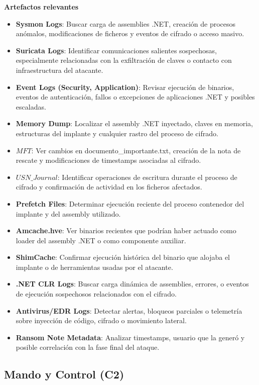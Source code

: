\textbf{Artefactos relevantes}
\begin{itemize}
    \item \textbf{Sysmon Logs}: Buscar carga de assemblies .NET, creación de procesos anómalos, modificaciones de ficheros y eventos de cifrado o acceso masivo.
    \item \textbf{Suricata Logs}: Identificar comunicaciones salientes sospechosas, especialmente relacionadas con la exfiltración de claves o contacto con infraestructura del atacante.
    \item \textbf{Event Logs (Security, Application)}: Revisar ejecución de binarios, eventos de autenticación, fallos o excepciones de aplicaciones .NET y posibles escaladas.
    \item \textbf{Memory Dump}: Localizar el assembly .NET inyectado, claves en memoria, estructuras del implante y cualquier rastro del proceso de cifrado.
    \item \textbf{$MFT$}: Ver cambios en documento\_importante.txt, creación de la nota de rescate y modificaciones de timestamps asociadas al cifrado.
    \item \textbf{$USN\_Journal$}: Identificar operaciones de escritura durante el proceso de cifrado y confirmación de actividad en los ficheros afectados.
    \item \textbf{Prefetch Files}: Determinar ejecución reciente del proceso contenedor del implante y del assembly utilizado.
    \item \textbf{Amcache.hve}: Ver binarios recientes que podrían haber actuado como loader del assembly .NET o como componente auxiliar.
    \item \textbf{ShimCache}: Confirmar ejecución histórica del binario que alojaba el implante o de herramientas usadas por el atacante.
    \item \textbf{.NET CLR Logs}: Buscar carga dinámica de assemblies, errores, o eventos de ejecución sospechosos relacionados con el cifrado.
    \item \textbf{Antivirus/EDR Logs}: Detectar alertas, bloqueos parciales o telemetría sobre inyección de código, cifrado o movimiento lateral.
    \item \textbf{Ransom Note Metadata}: Analizar timestamps, usuario que la generó y posible correlación con la fase final del ataque.
\end{itemize}

\subsection{Mando y Control (C2)}

